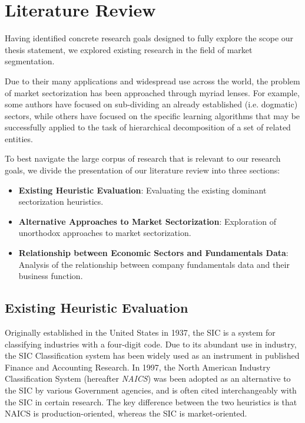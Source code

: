 \documentclass[../main.tex]{subfiles}
\begin{document}
    
\chapter{Literature Review} \label{literature_review}

Having identified concrete research goals designed to fully explore the scope our thesis statement, we explored existing research in the field of market segmentation.

Due to their many applications and widespread use across the world, the problem of market sectorization has been approached through myriad lenses. For example, some authors have focused on sub-dividing an already established (i.e. dogmatic) sectors, while others have focused on the specific learning algorithms that may be successfully applied to the task of hierarchical decomposition of a set of related entities.

To best navigate the large corpus of research that is relevant to our research goals, we divide the presentation of our literature review into three sections:

\begin{itemize}
    \item \textbf{Existing Heuristic Evaluation}: Evaluating the existing dominant sectorization heuristics.
    \item \textbf{Alternative Approaches to Market Sectorization}: Exploration of unorthodox approaches to market sectorization.
    \item \textbf{Relationship between Economic Sectors and Fundamentals Data}: Analysis of the relationship between company fundamentals data and their business function.
\end{itemize}


\section{Existing Heuristic Evaluation} \label{literature_review:existing_heuristic_evaluation}

Originally established in the United States in 1937, the SIC is a system for classifying industries with a four-digit code. Due to its abundant use in industry, the SIC Classification system has been widely used as an instrument in published Finance and Accounting Research. In 1997, the North American Industry Classification System (hereafter \textit{NAICS}) was been adopted as an alternative to the SIC by various Government agencies, and is often cited interchangeably with the SIC in certain research. The key difference between the two heuristics is that NAICS is production-oriented, whereas the SIC is market-oriented.
\end{document}

